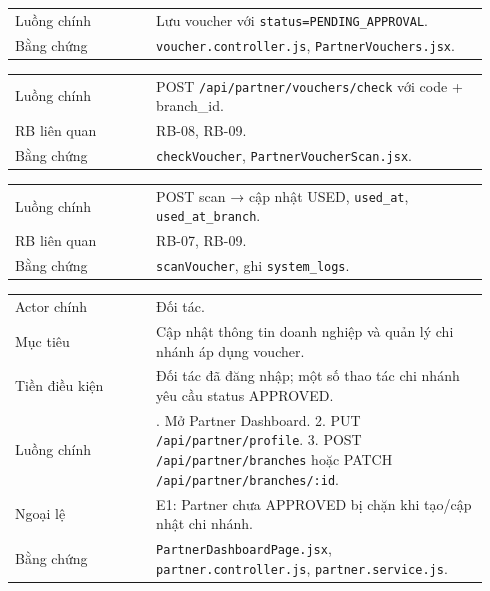 \begin{longtable}{>{\raggedright\arraybackslash}p{0.28\linewidth}>{\raggedright\arraybackslash}p{0.66\linewidth}}
Luồng chính & Lưu voucher với \texttt{status=PENDING\_APPROVAL}.\\
Bằng chứng & \texttt{voucher.controller.js}, \texttt{PartnerVouchers.jsx}.\\
\end{longtable}

\begin{longtable}{>{\raggedright\arraybackslash}p{0.28\linewidth}>{\raggedright\arraybackslash}p{0.66\linewidth}}
Luồng chính & POST \texttt{/api/partner/vouchers/check} với code + branch\_id.\\
RB liên quan & RB-08, RB-09.\\
Bằng chứng & \texttt{checkVoucher}, \texttt{PartnerVoucherScan.jsx}.\\
\end{longtable}

\begin{longtable}{>{\raggedright\arraybackslash}p{0.28\linewidth}>{\raggedright\arraybackslash}p{0.66\linewidth}}
Luồng chính & POST scan → cập nhật USED, \texttt{used\_at}, \texttt{used\_at\_branch}.\\
RB liên quan & RB-07, RB-09.\\
Bằng chứng & \texttt{scanVoucher}, ghi \texttt{system\_logs}.\\
\end{longtable}

\begin{longtable}{>{\raggedright\arraybackslash}p{0.28\linewidth}>{\raggedright\arraybackslash}p{0.66\linewidth}}
Actor chính & Đối tác.\\
Mục tiêu & Cập nhật thông tin doanh nghiệp và quản lý chi nhánh áp dụng voucher.\\
Tiền điều kiện & Đối tác đã đăng nhập; một số thao tác chi nhánh yêu cầu status APPROVED.\\
Luồng chính & 1. Mở Partner Dashboard. 2. PUT \texttt{/api/partner/profile}. 3. POST \texttt{/api/partner/branches} hoặc PATCH \texttt{/api/partner/branches/:id}.\\
Ngoại lệ & E1: Partner chưa APPROVED bị chặn khi tạo/cập nhật chi nhánh.\\
Bằng chứng & \texttt{PartnerDashboardPage.jsx}, \texttt{partner.controller.js}, \texttt{partner.service.js}.\\
\end{longtable}

